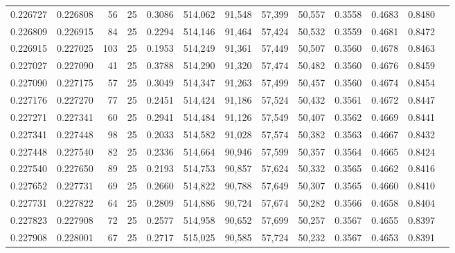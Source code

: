 \begin{tabular}{rrrrrrrrrrrrr}
0.226727 & 0.226808 &    56 &  25 &                                     0.3086 & 514,062 &  91,548 &  57,399 &  50,557 & 0.3558 & 0.4683 & 0.8480 \\
0.226809 & 0.226915 &    84 &  25 &                                     0.2294 & 514,146 &  91,464 &  57,424 &  50,532 & 0.3559 & 0.4681 & 0.8472 \\
0.226915 & 0.227025 &   103 &  25 &                                     0.1953 & 514,249 &  91,361 &  57,449 &  50,507 & 0.3560 & 0.4678 & 0.8463 \\
0.227027 & 0.227090 &    41 &  25 &                                     0.3788 & 514,290 &  91,320 &  57,474 &  50,482 & 0.3560 & 0.4676 & 0.8459 \\
0.227090 & 0.227175 &    57 &  25 &                                     0.3049 & 514,347 &  91,263 &  57,499 &  50,457 & 0.3560 & 0.4674 & 0.8454 \\
0.227176 & 0.227270 &    77 &  25 &                                     0.2451 & 514,424 &  91,186 &  57,524 &  50,432 & 0.3561 & 0.4672 & 0.8447 \\
0.227271 & 0.227341 &    60 &  25 &                                     0.2941 & 514,484 &  91,126 &  57,549 &  50,407 & 0.3562 & 0.4669 & 0.8441 \\
0.227341 & 0.227448 &    98 &  25 &                                     0.2033 & 514,582 &  91,028 &  57,574 &  50,382 & 0.3563 & 0.4667 & 0.8432 \\
0.227448 & 0.227540 &    82 &  25 &                                     0.2336 & 514,664 &  90,946 &  57,599 &  50,357 & 0.3564 & 0.4665 & 0.8424 \\
0.227540 & 0.227650 &    89 &  25 &                                     0.2193 & 514,753 &  90,857 &  57,624 &  50,332 & 0.3565 & 0.4662 & 0.8416 \\
0.227652 & 0.227731 &    69 &  25 &                                     0.2660 & 514,822 &  90,788 &  57,649 &  50,307 & 0.3565 & 0.4660 & 0.8410 \\
0.227731 & 0.227822 &    64 &  25 &                                     0.2809 & 514,886 &  90,724 &  57,674 &  50,282 & 0.3566 & 0.4658 & 0.8404 \\
0.227823 & 0.227908 &    72 &  25 &                                     0.2577 & 514,958 &  90,652 &  57,699 &  50,257 & 0.3567 & 0.4655 & 0.8397 \\
0.227908 & 0.228001 &    67 &  25 &                                     0.2717 & 515,025 &  90,585 &  57,724 &  50,232 & 0.3567 & 0.4653 & 0.8391 \\

\end{tabular}
